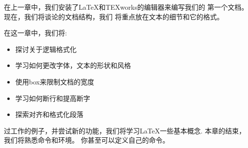 在上一章中，我们安装了LaTeX和TEXworks的编辑器来编写我们的
第一个文档。现在，我们将谈论的文档结构，我们
将重点放在文本的细节和它的格式。

在这一章中，我们将:
\begin{itemize}
	\item 探讨关于逻辑格式化
	\item 学习如何更改字体，文本的形状和风格
	\item 使用box来限制文档的宽度
	\item 学习如何断行和提高断字
	\item 探索对齐和格式化段落
\end{itemize}

过工作的例子，并尝试新的功能，我们将学习LaTeX一些基本概念.
本章的结束，我们将熟悉命令和环境。
你甚至可以定义自己的命令。
